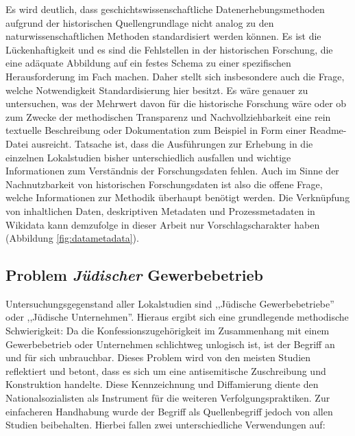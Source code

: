 Es wird deutlich, dass geschichtswissenschaftliche Datenerhebungsmethoden aufgrund der historischen Quellengrundlage nicht analog zu den naturwissenschaftlichen Methoden standardisiert werden können. Es ist die Lückenhaftigkeit und es sind die Fehlstellen in der historischen Forschung, die eine adäquate Abbildung auf ein festes Schema zu einer spezifischen Herausforderung im Fach machen. Daher stellt sich insbesondere auch die Frage, welche Notwendigkeit Standardisierung hier besitzt. Es wäre genauer zu untersuchen, was der Mehrwert davon für die historische Forschung wäre oder ob zum Zwecke der methodischen Transparenz und Nachvollziehbarkeit eine rein textuelle Beschreibung oder Dokumentation zum Beispiel in Form einer Readme-Datei ausreicht. Tatsache ist, dass die Ausführungen zur Erhebung in die einzelnen Lokalstudien bisher unterschiedlich ausfallen und wichtige Informationen zum Verständnis der Forschungsdaten fehlen. Auch im Sinne der Nachnutzbarkeit von historischen Forschungsdaten ist also die offene Frage, welche Informationen zur Methodik überhaupt benötigt werden. Die Verknüpfung von inhaltlichen Daten, deskriptiven Metadaten und Prozessmetadaten in Wikidata kann demzufolge in dieser Arbeit nur Vorschlagscharakter haben (Abbildung \ref{fig:datametadata}).

\subsection{Problem \textit{Jüdischer} Gewerbebetrieb}

Untersuchungsgegenstand aller Lokalstudien sind ,,Jüdische Gewerbebetriebe'' oder ,,Jüdische Unternehmen''. Hieraus ergibt sich eine grundlegende methodische Schwierigkeit: Da die Konfessionszugehörigkeit im Zusammenhang mit einem Gewerbebetrieb oder Unternehmen schlichtweg unlogisch ist, ist der Begriff an und für sich unbrauchbar. Dieses Problem wird von den meisten Studien reflektiert und betont, dass es sich um eine antisemitische Zuschreibung und Konstruktion handelte. Diese Kennzeichnung und Diffamierung diente den Nationalsozialisten als Instrument für die weiteren Verfolgungspraktiken. Zur einfacheren Handhabung wurde der Begriff als Quellenbegriff jedoch von allen Studien beibehalten. Hierbei fallen zwei unterschiedliche Verwendungen auf: 

